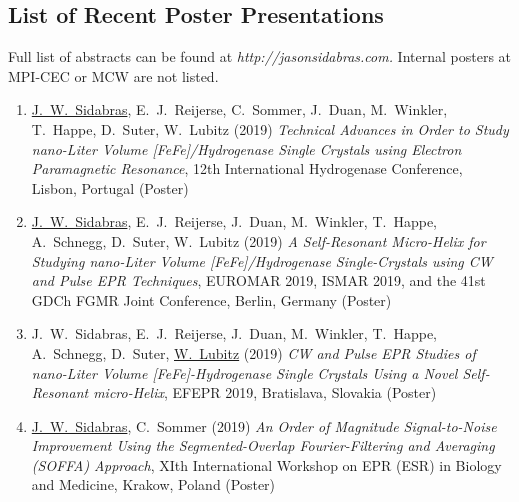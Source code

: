 \subsection*{List of Recent Poster Presentations}
Full list of abstracts can be found at \textit{http://jasonsidabras.com.} Internal posters at MPI-CEC or MCW are not listed.
\begin{enumerate}
\itemsep0em 
    \item \underline{J.~W.~Sidabras}, E.~J.~Reijerse, C.~Sommer, J.~Duan, M.~Winkler, T.~Happe, D.~Suter, W.~Lubitz (2019) \textit{Technical Advances in Order to Study nano-Liter Volume [FeFe]\-/Hydrogenase Single Crystals using Electron Paramagnetic Resonance}, 12th International Hydrogenase Conference, Lisbon, Portugal (Poster)
    \item \underline{J.~W.~Sidabras}, E.~J.~Reijerse, J.~Duan, M.~Winkler, T.~Happe, A.~Schnegg, D.~Suter, W.~Lubitz (2019) \textit{A Self-Resonant Micro-Helix for Studying nano-Liter Volume [FeFe]\-/Hydrogenase Single-Crystals using CW and Pulse EPR Techniques}, EUROMAR 2019, ISMAR 2019, and the 41st GDCh FGMR Joint Conference, Berlin, Germany (Poster)
    \item J.~W.~Sidabras, E.~J.~Reijerse, J.~Duan, M.~Winkler, T.~Happe, A.~Schnegg, D.~Suter, \underline{W.~Lubitz} (2019) \textit{CW and Pulse EPR Studies of nano-Liter Volume [FeFe]-Hydrogenase Single Crystals Using a Novel Self-Resonant micro-Helix}, EFEPR 2019, Bratislava, Slovakia (Poster)
    \item \underline{J.~W.~Sidabras}, C.~Sommer (2019) \textit{An Order of Magnitude Signal-to-Noise Improvement Using the Segmented-Overlap Fourier-Filtering and Averaging (SOFFA) Approach}, XIth International Workshop on EPR (ESR) in Biology and Medicine, Krakow, Poland (Poster)
\end{enumerate}
